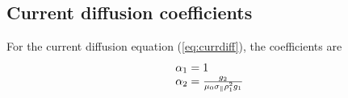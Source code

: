 \subsection{Current diffusion coefficients} %
\label{sub:currdiffcoef}
For the current diffusion equation (\ref{eq:currdiff}),
the coefficients are
\begin{equation}
\begin{array}{l}
{\alpha _1} = 1\\
{\alpha _2} = \frac{{{g_2}}}{{{\mu _0}{\sigma _\parallel }\rho _{\rm{1}}^2{g_1}}}\\

\end{array}
\end{equation}

